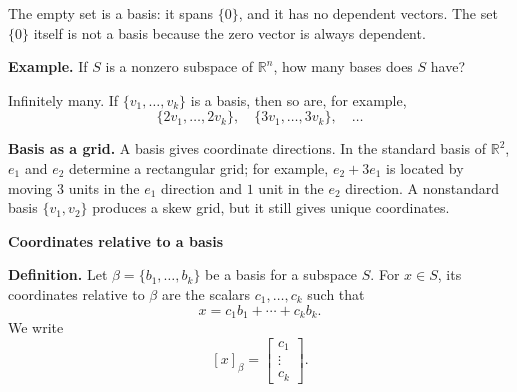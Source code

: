 \documentclass{article}
\begin{document}
\medskip

The empty set is a basis: it spans $\{0\}$, and it has no dependent vectors. The set $\{0\}$ itself is not a basis because the zero vector is always dependent.

\medskip

\textbf{Example.} If $S$ is a nonzero subspace of $\mathbb{R}^n$, how many bases does $S$ have?

\medskip

Infinitely many. If $\{v_1,\ldots,v_k\}$ is a basis, then so are, for example,
\[
\{2v_1,\ldots,2v_k\},\quad \{3v_1,\ldots,3v_k\},\quad \ldots
\]

\medskip

\textbf{Basis as a grid.} A basis gives coordinate directions. In the standard basis of $\mathbb{R}^2$, $e_1$ and $e_2$ determine a rectangular grid; for example, $e_2+3e_1$ is located by moving $3$ units in the $e_1$ direction and $1$ unit in the $e_2$ direction. A nonstandard basis $\{v_1,v_2\}$ produces a skew grid, but it still gives unique coordinates.

\begin{center}
\end{center}

\newpage

\textbf{Coordinates relative to a basis}

\medskip

\textbf{Definition.} Let $\beta=\{b_1,\ldots,b_k\}$ be a basis for a subspace $S$. For $x\in S$, its coordinates relative to $\beta$ are the scalars $c_1,\ldots,c_k$ such that
\[
x=c_1b_1+\cdots+c_kb_k.
\]
We write
\[
[x]_\beta=
\begin{bmatrix}c_1\\ \vdots\\ c_k\end{bmatrix}.
\]
\end{document}
